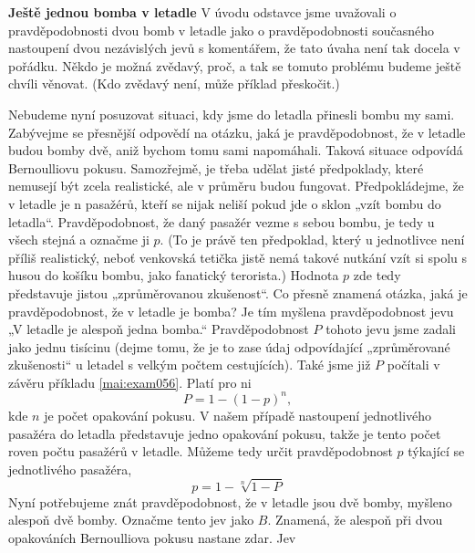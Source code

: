 \wikitextrule
\begin{example}\label{mai:exam060}
  \textbf{Ještě jednou bomba v letadle}\newline\small
  V úvodu odstavce jsme uvažovali o pravděpodobnosti dvou bomb v letadle jako o pravděpodobnosti současného 
  nastoupení dvou nezávislých jevů s komentářem, že tato úvaha není tak docela v pořádku. Někdo je možná 
  zvědavý, proč, a tak se tomuto problému budeme ještě chvíli věnovat. (Kdo zvědavý není, může příklad 
  přeskočit.)
  
  Nebudeme nyní posuzovat situaci, kdy jsme do letadla přinesli bombu my sami. Zabývejme se přesnější odpovědí 
  na otázku, jaká je pravděpodobnost, že v letadle budou bomby dvě, aniž bychom tomu sami napomáhali. Taková 
  situace odpovídá Bernoulliovu pokusu. Samozřejmě, je třeba udělat jisté předpoklady, které nemusejí být 
  zcela realistické, ale v průměru budou fungovat. Předpokládejme, že v letadle je n pasažérů, kteří se nijak 
  neliší pokud jde o sklon „vzít bombu do letadla“. Pravděpodobnost, že daný pasažér vezme s sebou bombu, je 
  tedy u všech stejná a označme ji \(p\). (To je právě ten předpoklad, který u jednotlivce není příliš 
  realistický, neboť venkovská tetička jistě nemá takové nutkání vzít si spolu s husou do košíku bombu, jako 
  fanatický terorista.) Hodnota \(p\) zde tedy představuje jistou „zprůměrovanou zkušenost“. Co přesně znamená 
  otázka, jaká je pravděpodobnost, že v letadle je bomba? Je tím myšlena pravděpodobnost jevu „V letadle je 
  alespoň jedna bomba.“ Pravděpodobnost \(P\) tohoto jevu jsme zadali jako jednu tisícinu (dejme tomu, že je 
  to zase údaj odpovídající „zprůměrované zkušenosti“ u letadel s velkým počtem cestujících). Také jsme již 
  \(P\) počítali v závěru příkladu \ref{mai:exam056}. Platí pro ni
  \begin{equation*}
    P = 1 - (1 - p)^n,
  \end{equation*}
  kde \(n\) je počet opakování pokusu. V našem případě nastoupení jednotlivého pasažéra do letadla představuje 
  jedno opakování pokusu, takže je tento počet roven počtu pasažérů v letadle. Můžeme tedy určit 
  pravděpodobnost \(p\) týkající se jednotlivého pasažéra,
  \begin{equation*}
    p = 1 - \sqrt[n]{1 - P}
  \end{equation*}
  Nyní potřebujeme znát pravděpodobnost, že v letadle jsou dvě bomby, myšleno alespoň dvě bomby. Označme tento 
  jev jako \(B\). Znamená, že alespoň při dvou opakováních Bernoulliova pokusu nastane zdar. Jev 

\end{example}
